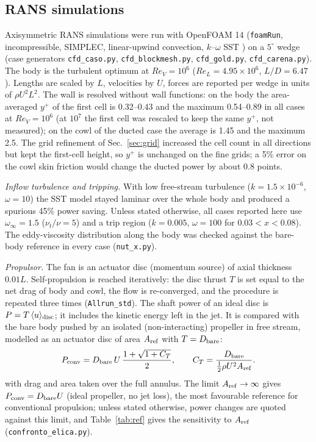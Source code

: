 \documentclass[11pt,a4paper]{article}
\newcommand{\ReV}{\mathit{Re}_V}
\newcommand{\ReL}{\mathit{Re}_L}
\begin{document}
\subsection{RANS simulations}
Axisymmetric RANS simulations were run with OpenFOAM 14 (\texttt{foamRun}, incompressible,
SIMPLEC, linear-upwind convection, $k$--$\omega$ SST \cite{menter1994}) on a
$5^\circ$ wedge (case generators \texttt{cfd\_caso.py}, \texttt{cfd\_blockmesh.py},
\texttt{cfd\_gold.py}, \texttt{cfd\_carena.py}). The body is the turbulent optimum at
$\ReV=10^6$ ($\ReL=4.95\times10^6$, $L/D=6.47$). Lengths are scaled by $L$, velocities by
$U$, forces are reported per wedge in units of $\rho U^2L^2$. The wall is resolved without wall functions: on the body the
area-averaged $y^+$ of the first cell is 0.32--0.43 and the maximum 0.54--0.89 in all cases at
$\ReV=10^6$ (at $10^7$ the first cell was rescaled to keep the same $y^+$, not measured);
on the cowl of the ducted case the average is 1.45 and the maximum 2.5.
The grid refinement of Sec.~\ref{sec:grid} increased the cell count in all directions but kept the
first-cell height, so $y^+$ is unchanged on the fine grids; a 5\% error on the cowl skin
friction would change the ducted power by about 0.8 points.

\emph{Inflow turbulence and tripping.} With low free-stream turbulence
($k=1.5\times10^{-6}$, $\omega=10$) the SST model stayed laminar over the whole body and
produced a spurious 45\% power saving. Unless stated otherwise, all cases reported here use
$\omega_\infty=1.5$ ($\nu_t/\nu=5$) and a trip region ($k=0.005$, $\omega=100$ for
$0.03<x<0.08$). The eddy-viscosity distribution along the body was checked against the
bare-body reference in every case (\texttt{nut\_x.py}).

\emph{Propulsor.} The fan is an actuator disc (momentum source) of axial thickness $0.01L$.
Self-propulsion is reached iteratively: the disc thrust $T$ is set equal to the net drag of
body and cowl, the flow is re-converged, and the procedure is repeated three times
(\texttt{Allrun\_std}). The shaft power of an ideal disc is $P=T\,\langle u\rangle_{\rm
disc}$; it includes the kinetic energy left in the jet. It is compared with the bare body
pushed by an isolated (non-interacting) propeller in free stream, modelled as an actuator
disc of area $A_{\rm ref}$ with $T=D_{\rm bare}$:
\begin{equation}
P_{\rm conv}=D_{\rm bare}\,U\,\frac{1+\sqrt{1+C_T}}{2},\qquad
C_T=\frac{D_{\rm bare}}{\tfrac12\rho U^2A_{\rm ref}}.
\label{eq:pconv}
\end{equation}
with drag and area taken over the full annulus. The limit $A_{\rm ref}\to\infty$ gives $P_{\rm conv}=D_{\rm bare}U$ (ideal propeller, no jet
loss), the most favourable reference for conventional propulsion; unless stated otherwise,
power changes are quoted against this limit, and Table~\ref{tab:ref} gives the sensitivity to
$A_{\rm ref}$ (\texttt{confronto\_elica.py}).
\end{document}
